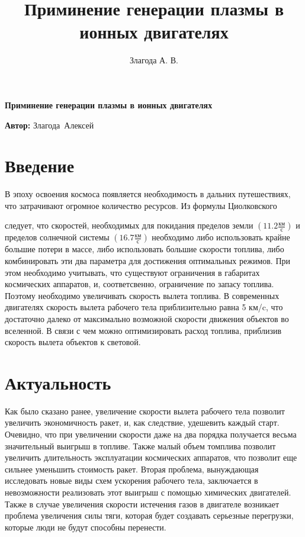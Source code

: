 \documentclass[a4paper,11pt]{article}
\author{Злагода А. В.}
\title{Приминение генерации плазмы в ионных двигателях}
\begin{document}
\begin{center}
\end{center}
\noindent\makebox[\linewidth]{\rule{\textwidth}{2pt}}
\begin{center}
	\Huge \bf Приминение генерации плазмы в ионных двигателях 
\end{center}

\hfill\Large
\vbox{%
\hfill%
\vbox{%
\hbox{\textbf{Автор:}}%
\hbox{Злагода Алексей}%
}%
} 

\section{\Large  Введение}

\indent
В эпоху освоения космоса появляется необходимость в дальних путешествиях, что затрачивают огромное количество ресурсов.
Из формулы Циолковского 

следует, что скоростей, необходимых для покидания пределов земли 
$(11.2\frac{\text{км}}{\text{с}})$
 и пределов солнечной системы 
 $(16.7\frac{\text{км}}{\text{с}})$
 необходимо либо использовать крайне большие потери в массе, либо использовать большие скорости топлива, либо комбинировать эти два параметра для достижения оптимальных режимов.   
При этом необходимо учитывать, что существуют ограничения в габаритах космических аппаратов, и, соответсвенно, ограничение по запасу топлива. Поэтому необходимо увеличивать скорость вылета топлива. 
\newline
\indent
В современных двигателях скорость вылета рабочего тела приблизительно равна 5 км/c, что достаточно далеко от максимально возможной скорости движения объектов во вселенной. В связи с чем можно оптимизировать расход топлива, приблизив скорость вылета объектов к световой.




\section{\Large Актуальность} 
Как было сказано ранее, увеличение скорости вылета рабочего тела позволит увеличить экономичность ракет, и, как следствие, удешевить каждый старт. 
Очевидно, что при увеличении скорости даже на два порядка получается весьма значительный выигрыш в топливе.
Также малый объем томплива позволит увеличить длительность эксплуатации космических аппаратов, что позволит еще сильнее уменьшить стоимость ракет.  
\newline
\indent
Вторая проблема, вынуждающая исследовать новые виды схем ускорения рабочего тела, заключается в невозможности реализовать этот выигрыш с помощью химических двигателей. 
Также в случае увеличения скорости истечения газов в двигателе возникает проблема увеличения силы тяги, которая будет создавать серьезные перегрузки, которые люди не будут способны перенести. 
\end{document}
